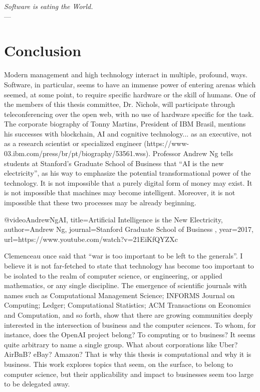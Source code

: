 \begin{flushright}{\slshape
	Software is eating the World.} \\ \medskip
    --- \citep{andreesen:2011}
\end{flushright}



\bigskip

\begingroup
\let\clearpage\relax
\let\cleardoublepage\relax
\let\cleardoublepage\relax

\chapter{Conclusion}
\bigskip

\noindent Modern management and high technology interact in multiple, profound, ways.  Software, in particular, seems to have an immense power of entering arenas which seemed, at some point, to require specific hardware or the skill of humans.  One of the members of this thesis committee, Dr. Nichols, will participate through teleconferencing over the open web, with no use of hardware specific for the task.  The corporate biography of Tonny Martins, President of IBM Brasil, mentions his successes with blockchain, AI and cognitive technology... as an executive, not as a research scientist or specialized engineer (https://www-03.ibm.com/press/br/pt/biography/53561.wss). Professor Andrew Ng tells students at Stanford’s Graduate School of Business that “AI is the new electricity”, as his way to emphasize the potential transformational power of the technology.  It is not impossible that a purely digital form of money may exist.  It is not impossible that machines may become intelligent.  Moreover, it is not impossible that these two processes may be already beginning.  

@video{AndrewNgAI, 
  title={Artificial Intelligence is the New Electricity},
  author={Andrew Ng},
  journal={Stanford Graduate School of Business },
  year={2017},
  url={https://www.youtube.com/watch?v=21EiKfQYZXc}
}

Clemenceau once said that “war is too important to be left to the generals”.  I believe it is not far-fetched to state that technology has become too important to be isolated to the realm of computer science, or engineering, or applied mathematics, or any single discipline.  The emergence of scientific journals with names such as Computational Management Science; INFORMS Journal on Computing; Ledger; Computational Statistics; ACM Transactions on Economics and Computation, and so forth, show that there are growing communities deeply interested in the intersection of business and the computer sciences.  To whom, for instance, does the OpenAI project belong?  To computing or to business?  It seems quite arbitrary to name a single group. What about corporations like Uber?  AirBnB?  eBay?  Amazon? That is why this thesis is computational and why it is business.  This work explores topics that seem, on the surface, to belong to computer science, but their applicability and impact to businesses seem too large to be delegated away.  

